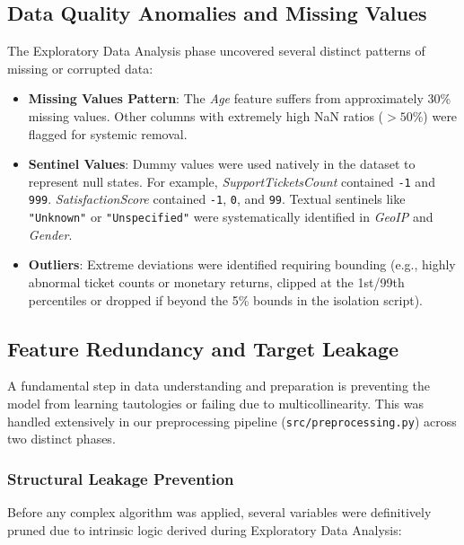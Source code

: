 \documentclass[11pt,a4paper]{article}
\begin{document}
\subsection{Data Quality Anomalies and Missing Values}
The Exploratory Data Analysis phase uncovered several distinct patterns of missing or corrupted data:
\begin{itemize}
    \item \textbf{Missing Values Pattern}: The \textit{Age} feature suffers from approximately 30\% missing values. Other columns with extremely high NaN ratios ($>50\%$) were flagged for systemic removal.
    \item \textbf{Sentinel Values}: Dummy values were used natively in the dataset to represent null states. For example, \textit{SupportTicketsCount} contained \texttt{-1} and \texttt{999}. \textit{SatisfactionScore} contained \texttt{-1}, \texttt{0}, and \texttt{99}. Textual sentinels like \texttt{"Unknown"} or \texttt{"Unspecified"} were systematically identified in \textit{GeoIP} and \textit{Gender}.
    \item \textbf{Outliers}: Extreme deviations were identified requiring bounding (e.g., highly abnormal ticket counts or monetary returns, clipped at the 1st/99th percentiles or dropped if beyond the 5\% bounds in the isolation script).
\end{itemize}

\subsection{Feature Redundancy and Target Leakage}
A fundamental step in data understanding and preparation is preventing the model from learning tautologies or failing due to multicollinearity. This was handled extensively in our preprocessing pipeline (\texttt{src/preprocessing.py}) across two distinct phases.

\subsubsection{Structural Leakage Prevention}
Before any complex algorithm was applied, several variables were definitively pruned due to intrinsic logic derived during Exploratory Data Analysis:
\end{document}
